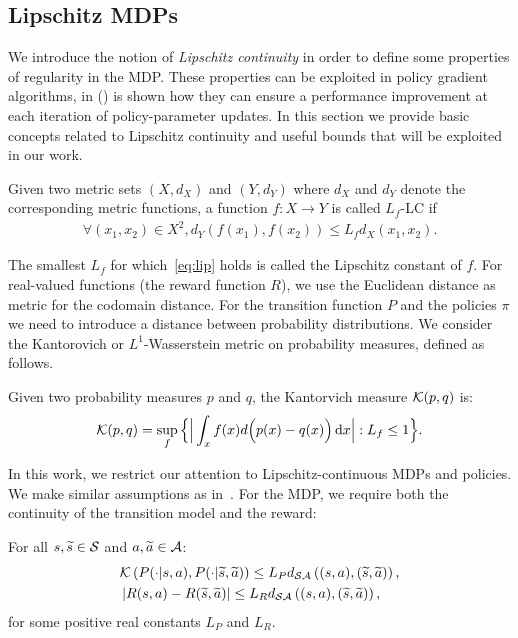 \subsection{Lipschitz \ac{MDPs}}
We introduce the notion of \emph{Lipschitz continuity} in order to define some properties of regularity in the \ac{MDP}. These properties can be exploited in policy gradient algorithms, in (\citet{pirotta2015policy}) is shown how they can ensure a performance improvement at each iteration of policy-parameter updates. In this section we provide basic concepts related to Lipschitz continuity and useful bounds that will be exploited in our work.
\begin{definition}
Given two metric sets $(X, d_X)$ and $(Y, d_Y)$ where $d_X$ and $d_Y$ denote the corresponding metric functions, a function $f: X \rightarrow Y$ is called $L_f$-\acf{LC} if
\begin{align} \forall(x_1, x_2) \in X^2, d_Y(f(x_1), f(x_2)) \leq L_f d_X(x_1, x_2). \label{eq:lip} \end{align}
\end{definition}
The smallest $L_f$ for which~\eqref{eq:lip} holds is called the Lipschitz constant of $f$. For real-valued functions (\eg the reward function $R$), we use the Euclidean distance as metric for the codomain distance. For the transition function $P$ and the policies $\pi$ we need to introduce a distance between probability distributions. We consider the Kantorovich or $L^1$-Wasserstein metric on probability measures, defined as follows.
\begin{definition}
Given two probability measures $p$ and $q$, the Kantorvich measure $\mathcal{K}(p, q)$ is:
$$ \mathcal{K}(p, q) = \sup_f\Big\{ \Big| \int_x f(x) d\Big(p(x)-q(x)\Big) \,\mathrm{d} x \Big|: L_f \leq 1 \Big\}.$$
\end{definition}
In this work, we restrict our attention to Lipschitz-continuous MDPs and policies. We make similar assumptions as in~\citep{pirotta2015policy}. For the MDP, we require both the continuity of the transition model and the reward:
%
\begin{assumption}\label{ass:lipmdp}
	For all $s,\widetilde{s}\in\mathcal{S}$ and $a,\widetilde{a}\in\mathcal{A}$:
	\begin{align}
	&\mathcal{K}\left(P(\cdot|s,a), P(\cdot| \widetilde{s},\widetilde{a})\right) \leq L_{P}d_{\mathcal{S}\mathcal{A}}\left((s,a),(\widetilde{s},\widetilde{a})\right), \\
	&\left|R(s,a) - R(\widetilde{s},\widetilde{a})\right| \leq L_{R}d_{\mathcal{S}\mathcal{A}}\left((s,a),(\widetilde{s},\widetilde{a})\right),
	\end{align}
	for some positive real constants $L_{P}$ and $L_{R}$.
\end{assumption}
